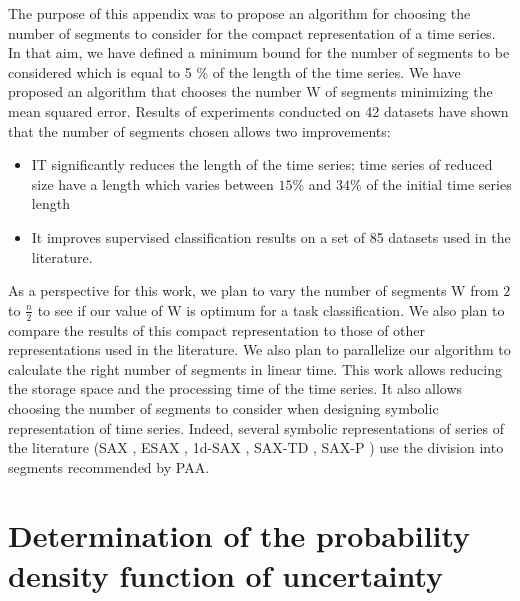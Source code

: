 The purpose of this appendix was to propose an algorithm for choosing the number of segments to consider for the compact representation of a time series. In that aim, we have defined a minimum bound for the number of segments to be considered which is equal to 5 \% of the length of the time series. We have proposed an algorithm that chooses the number W of segments minimizing the mean squared error. Results of experiments conducted on 42 datasets
 have shown that the number of segments chosen allows two improvements:
 \begin{itemize}
\item IT significantly reduces the length of the time series; time series of reduced size have a length
which varies between $ 15 \% $ and $ 34 \% $ of the initial time series length
\item It improves supervised classification results on a set of 85 datasets
used in the literature. 
\end{itemize}
As a perspective for this work, we plan to vary the number of
segments W from $ 2 $ to $ \frac{n}{2} $ to see if our value of W is optimum for a task classification. We also plan to compare the results of this compact representation to
those of other representations used in the literature. We also plan to parallelize our algorithm to calculate the right number of segments in linear time. This work allows
reducing the storage space and the processing time of the time series. It also allows choosing the number of segments to consider when designing symbolic representation 
 of time series. Indeed, several symbolic representations of series
of the literature (SAX \cite{lin2003symbolic}, ESAX \cite{lkhagva2006extended}, 1d-SAX \cite{Malinowski2013},
SAX-TD \cite{sun2014improvement}, SAX-P \cite{siyou2015}) use the division into segments recommended by PAA.
\label{conclusion}



















\chapter{Determination of the probability density function of  uncertainty}
\label{pdf_uncertainty}
\minitoc

